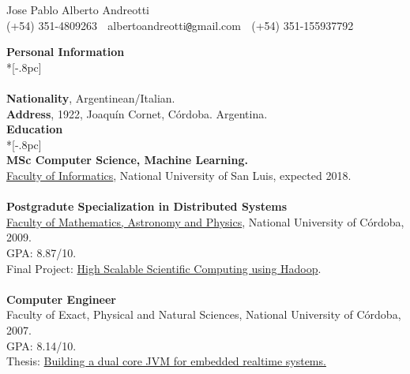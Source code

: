 \documentclass[letter,11pt,english]{article}
\begin{document}
\pagestyle{headings}
\setcounter{page}{1}
\begin{center}
{\Large Jose Pablo Alberto Andreotti} \\[.5pc]
(+54) 351-4809263 $\;$ albertoandreotti\verb|@|gmail.com $\;$ (+54) 351-155937792 \\[3pc]
\end{center}
{\large \bf Personal Information} \\*[-.8pc]
\underline{\hspace{6in}} \\
\\
{\bf Nationality}, Argentinean/Italian.\\
{\bf Address}, 1922, Joaqu\'in Cornet, C\'ordoba. Argentina.\\

{\large \bf Education} \\*[-.8pc]
\underline{\hspace{6in}} \\
{\bf MSc Computer Science, Machine Learning.}\\
\href{http://www.dirinfo.unsl.edu.ar/posgrado/}{Faculty of Informatics}, National University of San Luis, expected 2018. \\
\\
{\bf Postgradute Specialization in Distributed Systems}\\
\href{http://www.famaf.unc.edu.ar/}{Faculty of Mathematics, Astronomy and Physics}, National University of C\'ordoba, 2009. \\
GPA: 8.87/10. \\
Final Project: \href{https://docs.google.com/viewer?a=v&pid=explorer&chrome=true&srcid=0B5AOpwg8IzVANjJlODZhZDctNWUzMS00MmNhLWI3OWMtMWNhMTdjODQwNjVl&hl=en}{High Scalable Scientific Computing using Hadoop}.\\
\\
{\bf Computer Engineer}\\
Faculty of Exact, Physical and Natural Sciences, National University of C\'ordoba, 2007.\\
GPA: 8.14/10. \\
Thesis: \href{https://docs.google.com/viewer?a=v&pid=explorer&chrome=true&srcid=1gdJXYgQtLDHDOxGDtbKzdmAl1LmNx-yo4w6vNl-K_Z-1YocLhtJxMvoqGvd1&hl=en}{Building a dual core JVM for embedded realtime systems.}\\
\end{document}
